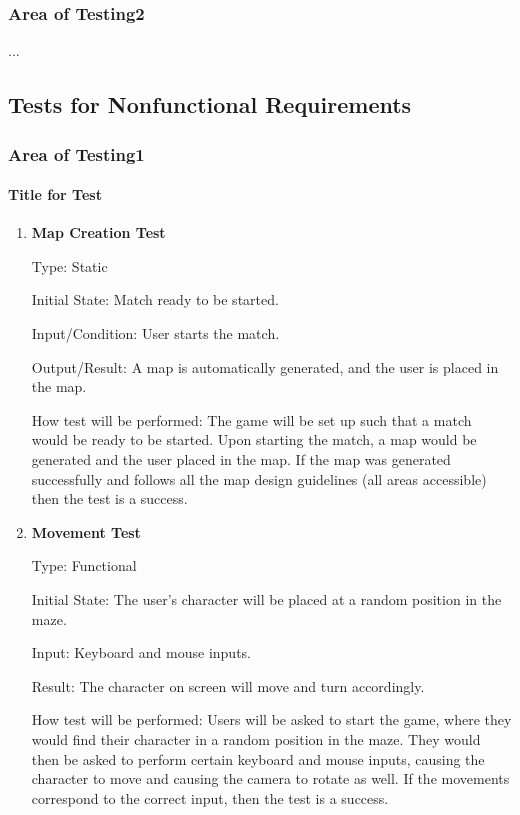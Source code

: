 \documentclass[12pt, titlepage]{article}
\begin{document}
\subsubsection{Area of Testing2}
...
\subsection{Tests for Nonfunctional Requirements}
\subsubsection{Area of Testing1}
		
\paragraph{Title for Test}
\begin{enumerate}
\item{}
\textbf{Map Creation Test}

Type: Static
					
Initial State: Match ready to be started.  
					
Input/Condition: User starts the match. 
					
Output/Result: A map is automatically generated, and the user is placed in the map. 
					
How test will be performed: The game will be set up such that a match would be ready to be started. Upon starting the match, a map would be generated and the user placed in the map. If the map was generated successfully and follows all the map design guidelines (all areas accessible) then the test is a success. 
					
\item{}
\textbf{Movement Test}

Type: Functional
					
Initial State: The user's character will be placed at a random position in the maze.
					
Input: Keyboard and mouse inputs.
					
Result: The character on screen will move and turn accordingly.
					
How test will be performed: Users will be asked to start the game, where they would find their character in a random position in the maze. They would then be asked to perform certain keyboard and mouse inputs, causing the character to move and causing the camera to rotate as well. If the movements correspond to the correct input, then the test is a success. 


\end{enumerate}
\end{document}
